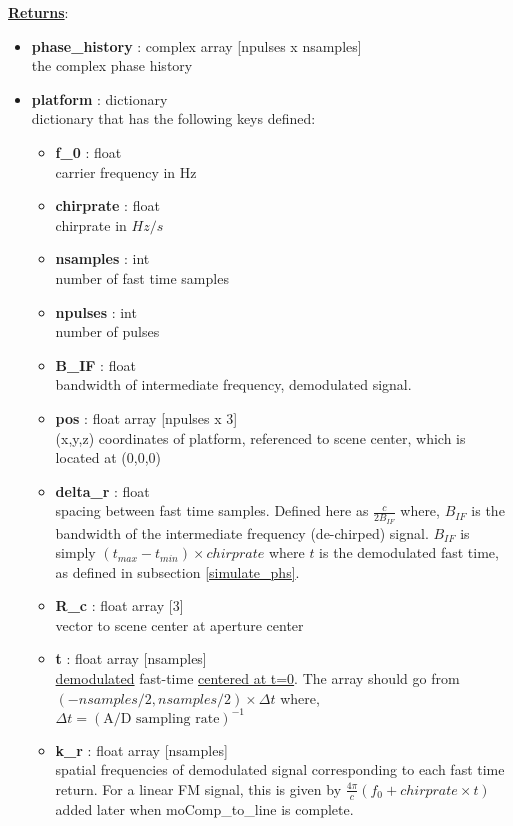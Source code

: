 \documentclass{article}
\newcommand{\defs}[2]{\textbf{{#1}} : {#2}}
\begin{document}
\noindent \underline{\textbf{Returns}}:
\begin{itemize}
	\item \defs{phase\_history}{complex array [npulses x nsamples]}\\
		the complex phase history
	  \item \defs{platform}{dictionary}\\
	  	dictionary that has the following keys defined:
	  \begin{itemize}
	    \item \defs{f\_0}{float}\\
	    	carrier frequency in Hz
		\item \defs{chirprate}{float}\\
		   	chirprate in $Hz/s$
	    \item \defs{nsamples}{int}\\
	    	number of fast time samples
	    \item \defs{npulses}{int}\\
	    	number of pulses
	    \item \defs{B\_IF}{float}\\
	    	bandwidth of intermediate frequency, demodulated signal.
	    \item \defs{pos}{float array [npulses x 3]}\\
	       	(x,y,z) coordinates of platform, referenced to scene center, which is located at (0,0,0)
	    \item \defs{delta\_r}{float}\\
       	   	spacing between fast time samples.  Defined here as $\frac{c}{2B_{IF}}$ where, $B_{IF}$ is the bandwidth of the intermediate frequency (de-chirped) signal.  $B_{IF}$ is simply $(t_{max}-t_{min})\times chirprate$ where $t$ is the demodulated fast time, as defined in subsection \ref{simulate_phs}.
	    \item \defs{R\_c}{float array [3]}\\
	     	vector to scene center at aperture center
	    \item \defs{t}{float array [nsamples]}\\
   	    	\underline{demodulated} fast-time \underline{centered at t=0}.  The array should go from $(-nsamples/2, nsamples/2)\times\Delta t$ where, $\Delta t = (\mbox{A/D sampling rate})^{-1}$
   	    \item\defs{k\_r}{float array [nsamples]}\\
   	    	spatial frequencies of demodulated signal corresponding to each fast time return.  For a linear FM signal, this is given by $\frac{4\pi}{c}(f_0+chirprate\times t)$ added later when moComp\_to\_line is complete.
	  \end{itemize}
\end{itemize}

\nocite*{}


\end{document}
